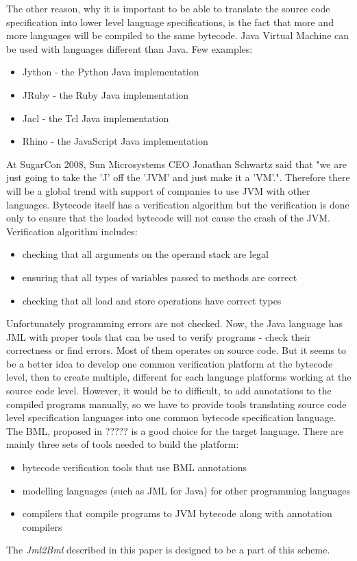 \documentclass{acm_proc_article-sp}
\begin{document}
The other reason, why it is important to be able to translate the source code specification into lower level language specifications, is the fact that more and more languages will be compiled to the same bytecode. Java Virtual Machine can be used with languages different than Java. Few examples:
\begin{itemize}
	\item Jython - the Python Java implementation
	\item JRuby - the Ruby Java implementation
	\item Jacl - the Tcl Java implementation
	\item Rhino - the JavaScript Java implementation
\end{itemize}
At SugarCon 2008, Sun Microsystems CEO Jonathan Schwartz said that "we are just going to take the 'J' off the 'JVM' and just make it a 'VM'.". Therefore there will be a global trend with support of companies to use JVM with other languages.
Bytecode itself has a verification algorithm but the verification is done only to ensure that the loaded bytecode will not cause the crash of the JVM. Verification algorithm includes:
\begin{itemize}
	\item checking that all arguments on the operand stack are legal
	\item ensuring that all types of variables passed to methods are correct
	\item checking that all load and store operations have correct types
\end{itemize}
Unfortunately programming errors are not checked. Now, the Java language has JML with proper tools that can be used to verify programs - check their correctness or find errors. Most of them operates on source code. But it seems to be a better idea to develop one common verification platform at the bytecode level, then to create multiple, different for each language platforms working at the source code level. However, it would be to difficult, to add annotations to the compiled programs manually, so we have to provide tools translating source code level specification languages into one common bytecode specification language. The BML, proposed in ????? is a good choice for the target language. There are mainly three sets of tools needed to build the platform:
\begin{itemize}
	\item bytecode verification tools that use BML annotations
	\item modelling languages (such as JML for Java) for other programming languages
	\item compilers that compile programs to JVM bytecode along with annotation compilers
\end{itemize}
The \textit{Jml2Bml} described in this paper is designed to be a part of this scheme.
\end{document}
